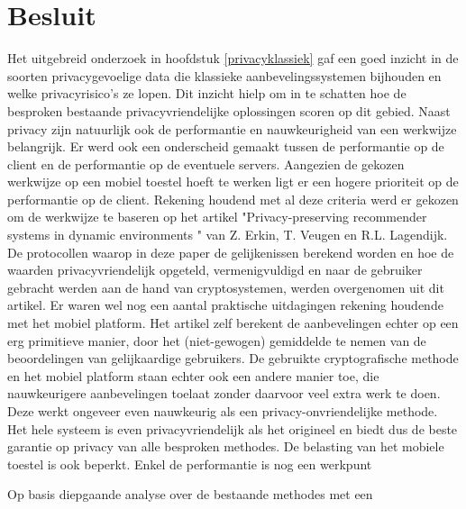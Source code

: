 \chapter{Besluit}


Het uitgebreid onderzoek in hoofdstuk \ref{privacyklassiek} gaf een goed inzicht in de soorten privacygevoelige data die klassieke aanbevelingssystemen bijhouden en welke privacyrisico's ze lopen. Dit inzicht hielp om in te schatten hoe de besproken bestaande privacyvriendelijke oplossingen scoren op dit gebied. Naast privacy zijn natuurlijk ook de performantie en nauwkeurigheid van een werkwijze belangrijk. Er werd ook een onderscheid gemaakt tussen de performantie op de client en de performantie op de eventuele servers. Aangezien de gekozen werkwijze op een mobiel toestel hoeft te werken ligt er een hogere prioriteit op de performantie op de client. Rekening houdend met al deze criteria werd er gekozen om de werkwijze te baseren op het artikel "Privacy-preserving recommender systems in dynamic environments \cite{ZErkinDyn}" van Z. Erkin, T. Veugen en R.L. Lagendijk. De protocollen waarop in deze paper de gelijkenissen berekend worden en hoe de waarden privacyvriendelijk opgeteld, vermenigvuldigd en naar de gebruiker gebracht werden aan de hand van cryptosystemen, werden overgenomen uit dit artikel. Er waren wel nog een aantal praktische uitdagingen rekening houdende met het mobiel platform. Het artikel zelf berekent de aanbevelingen echter op een erg primitieve manier, door het (niet-gewogen) gemiddelde te nemen van de beoordelingen van gelijkaardige gebruikers. De gebruikte cryptografische methode en het mobiel platform staan echter ook een andere manier toe, die nauwkeurigere aanbevelingen toelaat zonder daarvoor veel extra werk te doen. Deze werkt ongeveer even nauwkeurig als een privacy-onvriendelijke methode. Het hele systeem is even privacyvriendelijk als het origineel en biedt dus de beste garantie op privacy van alle besproken methodes. De belasting van het mobiele toestel is ook beperkt. Enkel de performantie is nog een werkpunt



Op basis 
diepgaande analyse over de bestaande methodes met een 